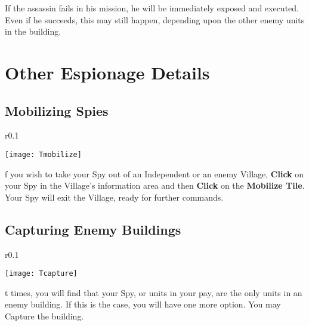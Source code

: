 If the assassin fails in his mission, he will be immediately exposed and executed. Even if he succeeds, this may still happen, depending upon the other enemy units in the building.

\section{\textsf{Other Espionage Details}}

\subsection{\textsf{Mobilizing Spies}}


\begin{wrapfigure}{r}{0.1\textwidth}
    \vspace{-20pt}
    \begin{center}
        \texttt{[image: Tmobilize]}
    \end{center}
    \vspace{-20pt}
\end{wrapfigure}

f you wish to take your Spy out of an Independent or an enemy Village, \textbf{Click} on your Spy in the Village’s information area and then \textbf{Click} on the \textbf{Mobilize Tile}. Your Spy will exit the Village, ready for further commands.

\subsection{\textsf{Capturing Enemy Buildings}}


\begin{wrapfigure}{r}{0.1\textwidth}
    \vspace{-20pt}
    \begin{center}
        \texttt{[image: Tcapture]}
    \end{center}
    \vspace{-20pt}
\end{wrapfigure}

t times, you will find that your Spy, or units in your pay, are the only units in an enemy building. If this is the case, you will have one more option. You may Capture the building.

